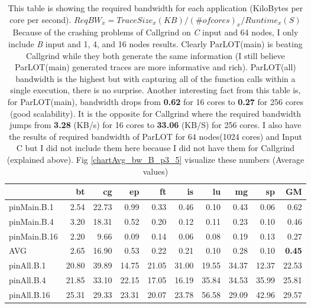 \begin{table}[]


\caption{This table is showing the required bandwidth for each application (KiloBytes per core per second). $ReqBW_x = TraceSize_x (KB) / (\# of cores)_x / Runtime_x (S)$
Because of the crashing problems of Callgrind on \textit{C} input and 64 nodes, I only include \textit{B} input and 1, 4, and 16 nodes results. Clearly ParLOT(main) is beating Callgrind while they both generate the same information (I still believe ParLOT(main) generated traces are more informative and rich). ParLOT(all) bandwidth is the highest but with capturing all of the function calls within a single execution, there is no surprise. Another interesting fact from this table is, for ParLOT(main), bandwidth drops from \textbf{0.62} for 16 cores to \textbf{0.27} for 256 cores (good scalability). It is the opposite for Callgrind where the required bandwidth jumps from \textbf{3.28} (KB/s) for 16 cores to \textbf{33.06} (KB/S) for 256 cores. I also have the results of required bandwidth of ParLOT for 64 nodes(1024 cores) and Input C but I did not include them here because I did not have them for Callgrind (explained above).  Fig \ref{chartAvg_bw_B_p3_5} visualize these numbers (Average values)}
\label{bw_pMpAcg_B_itn_p3.5}
\begin{center}
\begin{tabular}{|l|rrrrrrrr|r|}
\hline
                &    bt &    cg &    ep &    ft &    is &    lu &    mg &    sp &    GM \\
\hline
 pinMain.B.1    &  2.54 & 22.73 &  0.99 &  0.33 &  0.46 &  0.10 &  0.43 &  0.06 &  0.62 \\
 pinMain.B.4    &  3.20 & 18.31 &  0.52 &  0.20 &  0.12 &  0.11 &  0.23 &  0.10 &  0.46 \\
 pinMain.B.16   &  2.20 &  9.66 &  0.09 &  0.14 &  0.06 &  0.08 &  0.19 &  0.13 &  0.27 \\
 \hline
 AVG            &  2.65 & 16.90 &  0.53 &  0.22 &  0.21 &  0.10 &  0.28 &  0.10 &  \textbf{0.45} \\
 \hline
 pinAll.B.1     & 20.80 & 39.89 & 14.75 & 21.05 & 31.00 & 19.55 & 34.37 & 12.37 & 22.53 \\
 pinAll.B.4     & 21.85 & 33.10 & 22.15 & 17.05 & 16.19 & 35.84 & 34.53 & 35.99 & 25.81 \\
 pinAll.B.16    & 25.31 & 29.33 & 23.31 & 20.07 & 23.78 & 56.58 & 29.09 & 42.96 & 29.57 \\

\end{tabular}
\end{center}
\end{table}

